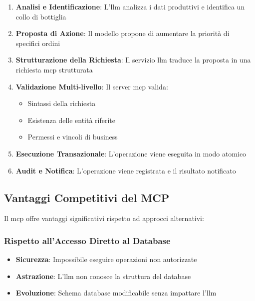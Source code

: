 \begin{enumerate}
    \item \textbf{Analisi e Identificazione}: L'\gls{llm} analizza i dati produttivi e identifica un collo di bottiglia
    
    \item \textbf{Proposta di Azione}: Il modello propone di aumentare la priorità di specifici ordini
    
    \item \textbf{Strutturazione della Richiesta}: Il servizio \gls{llm} traduce la proposta in una richiesta \gls{mcp} strutturata
    
    \item \textbf{Validazione Multi-livello}: Il server \gls{mcp} valida:
        \begin{itemize}
            \item Sintassi della richiesta
            \item Esistenza delle entità riferite
            \item Permessi e vincoli di business
        \end{itemize}
    
    \item \textbf{Esecuzione Transazionale}: L'operazione viene eseguita in modo atomico
    
    \item \textbf{Audit e Notifica}: L'operazione viene registrata e il risultato notificato
\end{enumerate}

\subsection{Vantaggi Competitivi del MCP}
\label{subsec:mcp_advantages}

Il \gls{mcp} offre vantaggi significativi rispetto ad approcci alternativi:

\subsubsection{Rispetto all'Accesso Diretto al Database}
\begin{itemize}
    \item \textbf{Sicurezza}: Impossibile eseguire operazioni non autorizzate
    \item \textbf{Astrazione}: L'\gls{llm} non conosce la struttura del database
    \item \textbf{Evoluzione}: Schema database modificabile senza impattare l'\gls{llm}
\end{itemize}

